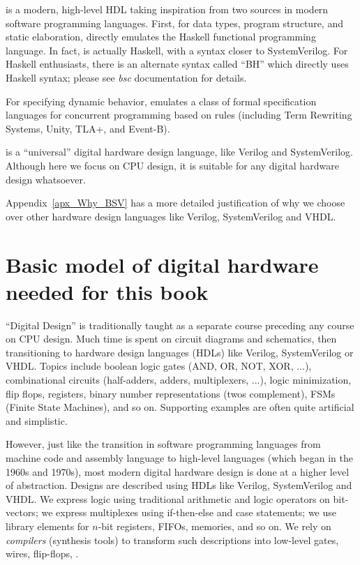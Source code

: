 
{\BSV} is a modern, high-level HDL taking inspiration from two sources in
modern software programming languages.  First, for data types, program
structure, and static elaboration, {\BSV} directly emulates the Haskell
functional programming language.  In fact, {\BSV} is actually Haskell,
with a syntax closer to SystemVerilog.  For Haskell enthusiasts, there
is an alternate syntax called ``BH'' which directly uses Haskell
syntax; please see \emph{bsc} documentation for details.

For specifying dynamic behavior, {\BSV} emulates a class of formal
specification languages for concurrent programming based on rules
(including Term Rewriting Systems, Unity, TLA+, and Event-B).

{\BSV} is a ``universal'' digital hardware design language, like Verilog
and SystemVerilog.  Although here we focus on CPU design, it is
suitable for any digital hardware design whatsoever.

Appendix~\ref{apx_Why_BSV} has a more detailed justification of why we
choose {\BSV} over other hardware design languages like Verilog,
SystemVerilog and VHDL.


\section{Basic model of digital hardware needed for this book}

``Digital Design'' is traditionally taught as a separate course
preceding any course on CPU design.  Much time is spent on circuit
diagrams and schematics, then transitioning to hardware design
languages (HDLs) like Verilog, SystemVerilog or VHDL.  Topics include
boolean logic gates (AND, OR, NOT, XOR, ...), combinational circuits
(half-adders, adders, multiplexers, ...), logic minimization, flip
flops, registers, binary number representations (twos complement),
FSMs (Finite State Machines), and so on.  Supporting examples are
often quite artificial and simplistic.

However, just like the transition in software programming languages
from machine code and assembly language to high-level languages (which
began in the 1960s and 1970s), most modern digital hardware design is
done at a higher level of abstraction.  Designs are described using
HDLs like Verilog, SystemVerilog and VHDL.  We express logic using
traditional arithmetic and logic operators on bit-vectors; we express
multiplexes using if-then-else and case statements; we use library
elements for $n$-bit registers, FIFOs, memories, and so on.  We rely
on \emph{compilers} (synthesis tools) to transform such descriptions
into low-level gates, wires, flip-flops, {\etc}.

